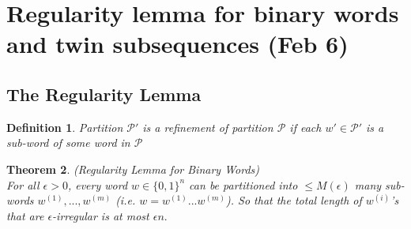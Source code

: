 \documentclass[a4paper]{article}
\newtheorem{thm}{Theorem}[section]
\newtheorem{defn}[thm]{Definition}
\begin{document}
\newpage
\section{Regularity lemma for binary words and twin subsequences (Feb 6)}

\subsection{The Regularity Lemma}
\begin{defn}
    Partition $\mathcal{P}'$ is a refinement of partition $\mathcal{P}$ if each $w'\in \mathcal{P}'$ is a sub-word of some word in $\mathcal{P}$  
\end{defn}
\begin{thm}
    (Regularity Lemma for Binary Words)\\
    For all $\epsilon>0$, every word $w\in \{0,1\}^n$ can be partitioned into $\leq M(\epsilon)$ many sub-words $w^{(1)},...,w^{(m)}$ (i.e. $w=w^{(1)}...w^{(m)}$). So that the total length of $w^{(i)}$'s that are $\epsilon$-irregular is at most $\epsilon n.$  
\end{thm}
\end{document}
